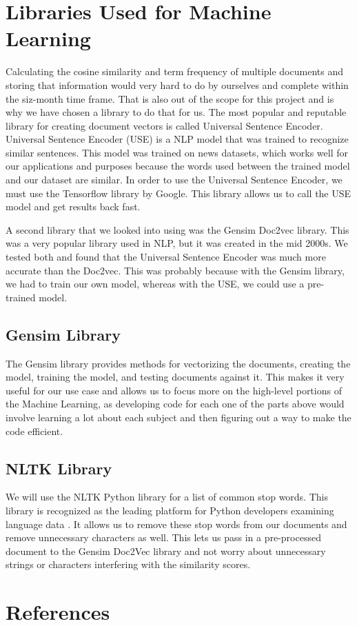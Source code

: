 \documentclass[onecolumn, draftclsnofoot,10pt, compsoc]{IEEEtran}
\begin{document}
\section{Libraries Used for Machine Learning}
Calculating the cosine similarity and term frequency of multiple documents and storing that information would very hard to do by ourselves and complete within the siz-month time frame. That is also out of the scope for this project and is why we have chosen a library to do that for us. The most popular and reputable library for creating document vectors is called Universal Sentence Encoder. Universal Sentence Encoder (USE) is a NLP model that was trained to recognize similar sentences. This model was trained on news datasets, which works well for our applications and purposes because the words used between the trained model and our dataset are similar. In order to use the Universal Sentence Encoder, we must use the Tensorflow library by Google. This library allows us to call the USE model and get results back fast.\par
A second library that we looked into using was the Gensim Doc2vec library. This was a very popular library used in NLP, but it was created in the mid 2000s. We tested both and found that the Universal Sentence Encoder was much more accurate than the Doc2vec. This was probably because with the Gensim library, we had to train our own model, whereas with the USE, we could use a pre-trained model.
\subsection{Gensim Library}
The Gensim library provides methods for vectorizing the documents, creating the model, training the model, and testing documents against it. This makes it very useful for our use case and allows us to focus more on the high-level portions of the Machine Learning, as developing code for each one of the parts above would involve learning a lot about each subject and then figuring out a way to make the code efficient. \par
\subsection{NLTK Library}
We will use the NLTK Python library for a list of common stop words. This library is recognized as the leading platform for Python developers examining language data \cite{NLTK}. It allows us to remove these stop words from our documents and remove unnecessary characters as well. This lets us pass in a pre-processed document to the Gensim Doc2Vec library and not worry about unnecessary strings or characters interfering with the similarity scores.
\section{References}
\begingroup
\renewcommand{\addcontentsline}[3]{}%
\renewcommand{\section}[2]{}%


\endgroup
\end{document}
